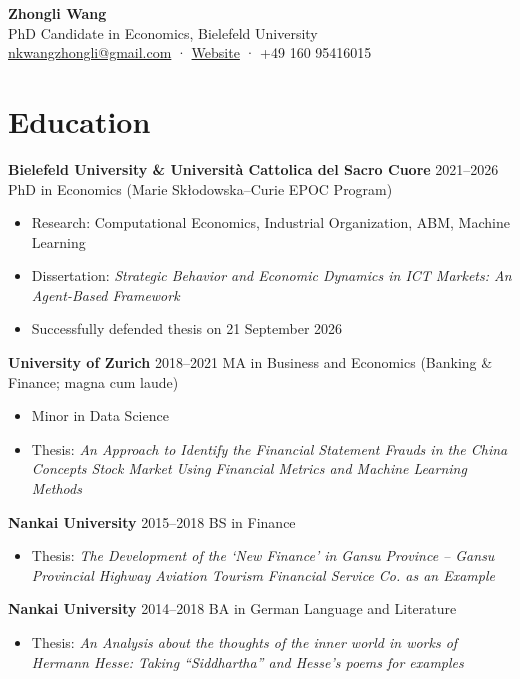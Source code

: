 \documentclass[a4paper,11pt]{article}
\begin{document}
\begin{center}
{\LARGE \textbf{Zhongli Wang}}\\[4pt]
PhD Candidate in Economics, Bielefeld University\\
\href{mailto:nkwangzhongli@gmail.com}{nkwangzhongli@gmail.com} · 
\href{https://sites.google.com/view/zhongli-wang}{Website} · 
+49 160 95416015
\end{center}

\section{Education}

\textbf{Bielefeld University \& Università Cattolica del Sacro Cuore} \hfill 2021–2026  
PhD in Economics (Marie Skłodowska–Curie EPOC Program)  
\begin{itemize}
\item Research: Computational Economics, Industrial Organization, ABM, Machine Learning  
\item Dissertation: \emph{Strategic Behavior and Economic Dynamics in ICT Markets: An Agent-Based Framework}  
\item Successfully defended thesis on 21 September 2026  
\end{itemize}

\textbf{University of Zurich} \hfill 2018–2021  
MA in Business and Economics (Banking \& Finance; magna cum laude)  
\begin{itemize}
\item Minor in Data Science  
\item Thesis: \textit{An Approach to Identify the Financial Statement Frauds in the China Concepts Stock Market Using Financial Metrics and Machine Learning Methods}   
\end{itemize}

\textbf{Nankai University} \hfill 2015–2018  
BS in Finance  
\begin{itemize}
    \item Thesis: \textit{The Development of the `New Finance' in Gansu Province – Gansu Provincial Highway Aviation Tourism Financial Service Co. as an Example}
\end{itemize}

\textbf{Nankai University} \hfill 2014–2018  
BA in German Language and Literature
\begin{itemize}
    \item Thesis: \textit{An Analysis about the thoughts of the inner world in works of Hermann Hesse: Taking “Siddhartha” and Hesse’s poems for examples}
\end{itemize}
\end{document}
